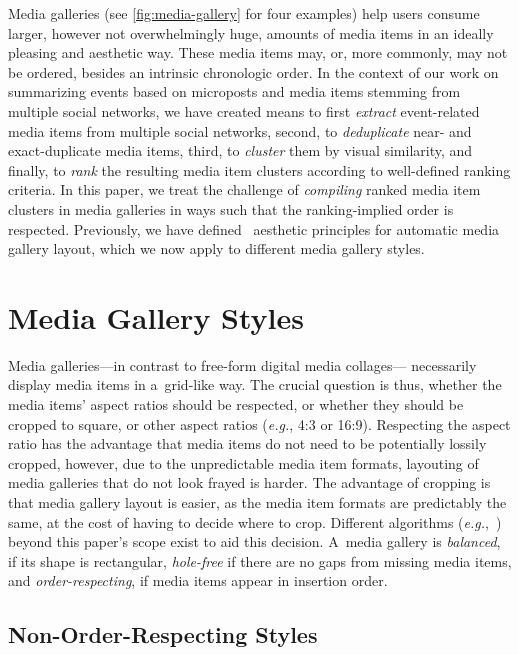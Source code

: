 \documentclass{sig-alternate}
\begin{document}
Media galleries (see \autoref{fig:media-gallery} for four examples)
help users consume larger, however not overwhelmingly huge,
amounts of media items in an ideally pleasing and aesthetic way.
These media items may, or, more commonly, may not be ordered,
besides an intrinsic chronologic order.
In the context of our work on summarizing events
based on microposts and media items stemming from
multiple social networks, we have created means
to first \emph{extract} event-related media items
from multiple social networks, second, to
\emph{deduplicate} near- and exact-duplicate media items,
third, to \emph{cluster} them by visual similarity, and
finally, to \emph{rank} the resulting media item clusters
according to well-defined ranking criteria.
In this paper, we treat the challenge of \emph{compiling}
ranked media item clusters in media galleries in ways
such that the ranking-implied order is respected.
Previously, we have defined~\cite{steiner2012definingaesthetic}
aesthetic principles for automatic media gallery layout,
which we now apply to different media gallery styles.

\section{Media Gallery Styles}

Media galleries---in contrast to free-form digital media collages---%
necessarily display media items in a~grid-like way.
The crucial question is thus, whether the media items' aspect ratios
should be respected, or whether they should be cropped to square,
or other aspect ratios (\emph{e.g.}, 4:3 or 16:9).
Respecting the aspect ratio has the advantage that media items
do not need to be potentially lossily cropped,
however, due to the unpredictable media item formats,
layouting of media galleries
that do not look frayed is harder.
The advantage of cropping is that media gallery layout is easier,
as the media item formats are predictably the same,
at the cost of having to decide where to crop.
Different algorithms (\emph{e.g.},~\cite{suh2003thumbnail})
beyond this paper's scope exist to aid this decision.
A~media gallery is \emph{balanced}, if its shape is rectangular,
\emph{hole-free} if there are no gaps from missing media items,
and \emph{order-respecting},
if media items appear in insertion order.

\subsection{Non-Order-Respecting Styles}
\end{document}
